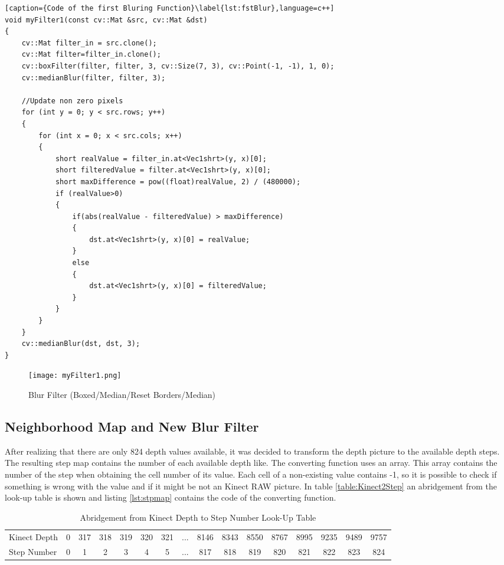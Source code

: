\begin{lstlisting}[caption={Code of the first Bluring Function}\label{lst:fstBlur},language=c++]
void myFilter1(const cv::Mat &src, cv::Mat &dst)
{
	cv::Mat filter_in = src.clone();
	cv::Mat filter=filter_in.clone();
	cv::boxFilter(filter, filter, 3, cv::Size(7, 3), cv::Point(-1, -1), 1, 0);
	cv::medianBlur(filter, filter, 3);
	
	//Update non zero pixels
	for (int y = 0; y < src.rows; y++)
	{
		for (int x = 0; x < src.cols; x++)
		{
			short realValue = filter_in.at<Vec1shrt>(y, x)[0];
			short filteredValue = filter.at<Vec1shrt>(y, x)[0];
			short maxDifference = pow((float)realValue, 2) / (480000);
			if (realValue>0)
			{
				if(abs(realValue - filteredValue) > maxDifference)
				{
					dst.at<Vec1shrt>(y, x)[0] = realValue;
				}
				else
				{
					dst.at<Vec1shrt>(y, x)[0] = filteredValue;
				}
			}
		}
	}
	cv::medianBlur(dst, dst, 3);
}
\end{lstlisting}

\begin{figure}[H]
\begin{center}
  \texttt{[image: myFilter1.png]}
  \caption{Blur Filter (Boxed/Median/Reset Borders/Median)}
  \label{figure:blur}
\end{center}
\end{figure}

\subsection{Neighborhood Map and New Blur Filter} \label{sect:blurFilter} 
After realizing that there are only 824 depth values available, it was decided to transform the depth picture
to the available depth steps. The resulting step map contains the number of each available depth like. 
The converting function uses an array. This array contains the number of the
step when obtaining the cell number of its value. Each cell of a non-existing value contains -1, so it is
possible to check if something is wrong with the value and if it might be not an Kinect RAW picture.
In table \vref{table:Kinect2Step} an abridgement from the look-up table is shown and listing 
\vref{lst:stpmap} contains the code of the converting function.


\begin{table}[H]
\centering
\tiny
\begin{tabular}{lccccccccccccccc}
Kinect Depth& 0 & 317 & 318 & 319 & 320 & 321 & ... & 8146 & 8343 & 8550 & 8767 & 8995 & 9235 & 9489 & 9757\\
Step Number & 0 &   1 &   2 &   3 &   4 &   5 & ... &   817 & 818 &  819 &  820 &  821 &  822 & 823  & 824\\
\end{tabular}
\caption{Abridgement from Kinect Depth to Step Number Look-Up Table }
\label{table:Kinect2Step}
\end{table}


